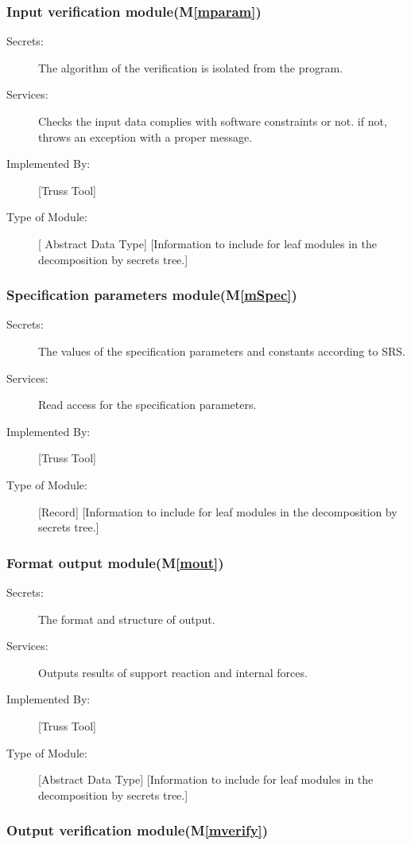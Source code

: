 \documentclass[12pt, titlepage]{article}
\newcommand{\mref}[1]{M\ref{#1}}
\begin{document}
\subsubsection{Input verification module(\mref{mparam})}

\begin{description}
\item[Secrets:] The algorithm of the verification is isolated from the program.
\item[Services:] Checks the input data complies with software constraints or not. if not, throws an exception with a proper message.
\item[Implemented By:] [Truss Tool]
\item[Type of Module:] [ Abstract Data Type]
  [Information to include for leaf modules in the decomposition by secrets tree.]
\end{description}
\subsubsection{Specification parameters module(\mref{mSpec})}

\begin{description}
\item[Secrets:]The values of the specification parameters and constants according to SRS.
\item[Services:] Read access for the specification parameters.
\item[Implemented By:] [Truss Tool]
\item[Type of Module:] [Record]
  [Information to include for leaf modules in the decomposition by secrets tree.]
\end{description}
\subsubsection{Format output module(\mref{mout})}

\begin{description}
\item[Secrets:]The format and structure of output.
\item[Services:] Outputs results of support reaction and internal forces.
\item[Implemented By:] [Truss Tool]
\item[Type of Module:] [Abstract Data Type]
  [Information to include for leaf modules in the decomposition by secrets tree.]
\end{description}
\subsubsection{Output verification module(\mref{mverify})}
\end{document}
